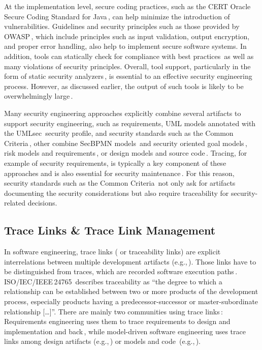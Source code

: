 At the implementation level, secure coding practices, such as the CERT Oracle Secure Coding Standard for Java\,\cite{long2011cert}, can help minimize the introduction of vulnerabilities.
Guidelines and security principles such as those provided by OWASP\,\cite{secure-coding}, which include principles such as input validation, output encryption, and proper error handling, also help to implement secure software systems.
In addition, tools can statically check for compliance with best practices\,\cite{sonar} as well as many violations of security principles.
Overall, tool support, particularly in the form of static security analyzers\,\cite{BCP+13}, is essential to an effective security engineering process.
However, as discussed earlier, the output of such tools is likely to be overwhelmingly large\,\cite{Walden2014}.

Many security engineering approaches explicitly combine several artifacts to support security engineering, such as requirements, UML models annotated with the UMLsec\,\cite{jurjens2005secure} security profile, and security standards such as the Common Criteria\,\cite{houmb2010eliciting}, other combine
SecBPMN models\,\cite{Salnitri2017DSB} and security oriented goal models\,\cite{Salnitri2020},
risk models and requirements\,\cite{5507389}, or design models and source code\,\cite{Peldszus2022}.
Tracing, for example of security requirements, is typically a key component of these approaches and is also essential for security maintenance\,\cite{Yu2008}.
For this reason, security standards such as the Common Criteria\,\cite{cc} not only ask for artifacts documenting the security considerations but also require traceability for security-related decisions.


\subsection{Trace Links \& Trace Link Management}
\label{sec:background:tracelinks}
In software engineering, trace links (%
or
traceability links)  are explicit interrelations between multiple development artifacts (e.g.,\,\cite{schwarz2010gbt}).
Those links have to be distinguished from traces, which are recorded software execution paths\,\cite{Praehofer2014,Hendriks2016}. ISO/IEC/IEEE\,24765\,\cite{ISO24765:2010} describes traceability as \enquote{the degree to which a relationship can be established between two or more products of the development process, especially products having a predecessor-successor or master-subordinate relationship %
[\dots]}. There are mainly two communities using trace links\,\cite{winkler2010survey}: %
Requirements engineering %
uses %
them
to trace requirements to design and implementation and back\,\cite{Gotel1994Trace,Pinheiro2004trace}, while model-driven software engineering uses trace links among design artifacts (e.g.,\,\cite{Mouratidis2010GDS,Ahmadian2017MBP}) or models and code~(e.g.,\,\cite{Peldszus2019SDF}).

